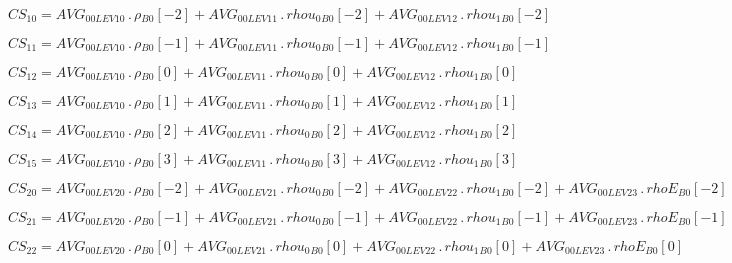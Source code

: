 \documentclass{article}
\begin{document}
\begin{dmath}CS_{10} = AVG_{0 0 LEV 10} \,.\, {\rho{_{B0}}}[{-2}] + AVG_{0 0 LEV 11} \,.\, {rhou_{0}{_{B0}}}[{-2}] + AVG_{0 0 LEV 12} \,.\, {rhou_{1}{_{B0}}}[{-2}]\end{dmath}

\begin{dmath}CS_{11} = AVG_{0 0 LEV 10} \,.\, {\rho{_{B0}}}[{-1}] + AVG_{0 0 LEV 11} \,.\, {rhou_{0}{_{B0}}}[{-1}] + AVG_{0 0 LEV 12} \,.\, {rhou_{1}{_{B0}}}[{-1}]\end{dmath}

\begin{dmath}CS_{12} = AVG_{0 0 LEV 10} \,.\, {\rho{_{B0}}}[{0}] + AVG_{0 0 LEV 11} \,.\, {rhou_{0}{_{B0}}}[{0}] + AVG_{0 0 LEV 12} \,.\, {rhou_{1}{_{B0}}}[{0}]\end{dmath}

\begin{dmath}CS_{13} = AVG_{0 0 LEV 10} \,.\, {\rho{_{B0}}}[{1}] + AVG_{0 0 LEV 11} \,.\, {rhou_{0}{_{B0}}}[{1}] + AVG_{0 0 LEV 12} \,.\, {rhou_{1}{_{B0}}}[{1}]\end{dmath}

\begin{dmath}CS_{14} = AVG_{0 0 LEV 10} \,.\, {\rho{_{B0}}}[{2}] + AVG_{0 0 LEV 11} \,.\, {rhou_{0}{_{B0}}}[{2}] + AVG_{0 0 LEV 12} \,.\, {rhou_{1}{_{B0}}}[{2}]\end{dmath}

\begin{dmath}CS_{15} = AVG_{0 0 LEV 10} \,.\, {\rho{_{B0}}}[{3}] + AVG_{0 0 LEV 11} \,.\, {rhou_{0}{_{B0}}}[{3}] + AVG_{0 0 LEV 12} \,.\, {rhou_{1}{_{B0}}}[{3}]\end{dmath}

\begin{dmath}CS_{20} = AVG_{0 0 LEV 20} \,.\, {\rho{_{B0}}}[{-2}] + AVG_{0 0 LEV 21} \,.\, {rhou_{0}{_{B0}}}[{-2}] + AVG_{0 0 LEV 22} \,.\, {rhou_{1}{_{B0}}}[{-2}] + AVG_{0 0 LEV 23} \,.\, {rhoE{_{B0}}}[{-2}]\end{dmath}

\begin{dmath}CS_{21} = AVG_{0 0 LEV 20} \,.\, {\rho{_{B0}}}[{-1}] + AVG_{0 0 LEV 21} \,.\, {rhou_{0}{_{B0}}}[{-1}] + AVG_{0 0 LEV 22} \,.\, {rhou_{1}{_{B0}}}[{-1}] + AVG_{0 0 LEV 23} \,.\, {rhoE{_{B0}}}[{-1}]\end{dmath}

\begin{dmath}CS_{22} = AVG_{0 0 LEV 20} \,.\, {\rho{_{B0}}}[{0}] + AVG_{0 0 LEV 21} \,.\, {rhou_{0}{_{B0}}}[{0}] + AVG_{0 0 LEV 22} \,.\, {rhou_{1}{_{B0}}}[{0}] + AVG_{0 0 LEV 23} \,.\, {rhoE{_{B0}}}[{0}]\end{dmath}
\end{document}
